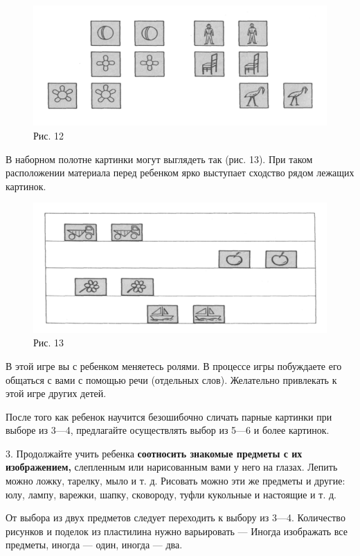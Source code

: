 \documentclass[a5paper]{book}
\begin{document}
\begin{figure}
\centering
\includegraphics[width=\linewidth]{media/media/image12.png}
\caption*{Рис. 12}
\end{figure}

В наборном полотне картинки могут выглядеть так (рис. 13). При таком
расположении материала перед ребенком ярко выступает сходство рядом
лежащих картинок.

\begin{figure}
\centering
\includegraphics[width=\linewidth]{media/media/image13.png}
\caption*{Рис. 13}
\end{figure}

В этой игре вы с ребенком меняетесь ролями. В процессе игры побуждаете
его общаться с вами с помощью речи (отдельных слов). Желательно
привлекать к этой игре других детей.

После того как ребенок научится безошибочно сличать парные картинки при
выборе из 3---4, предлагайте осуществлять выбор из 5---6 и более
картинок.

3. Продолжайте учить ребенка \textbf{соотносить знакомые предметы с их
изображением,} слепленным или нарисованным вами у него на глазах. Лепить
можно ложку, тарелку, мыло и т. д. Рисовать можно эти же предметы и
другие: юлу, лампу, варежки, шапку, сковороду, туфли кукольные и
настоящие и т. д.

От выбора из двух предметов следует переходить к выбору из 3---4.
Количество рисунков и поделок из пластилина нужно варьировать --- Иногда
изображать все предметы, иногда --- один, иногда --- два.
\end{document}
